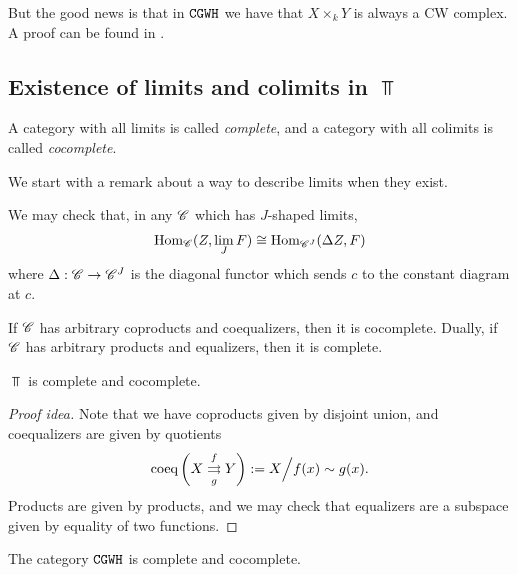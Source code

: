 \documentclass{article}[11pt]
\begin{document}
But the good news is that in $\texttt{CGWH}$ we have that $X\times_k Y$ is always a CW complex. A proof can be found in \cite[Theorem A.6]{Hatcher}.

\subsection{Existence of limits and colimits in $\Top$}

\begin{definition} A category with all limits is called \textit{complete}, and a category with all colimits is called \textit{cocomplete}.
\end{definition}

We start with a remark about a way to describe limits when they exist. 

\begin{remark}\label{diagonallimit} We may check that, in any $\mathscr{C}$ which has $J$-shaped limits,
	\begin{align*}
		\textup{Hom}_{\mathscr{C}} (Z, \lim_J F) \cong \textup{Hom}_{\mathscr{C}^J} (\Delta  Z, F)
	\end{align*}
	where $\Delta : \mathscr{C} \to \mathscr{C}^J$ is the diagonal functor which sends $c$ to the constant diagram at $c$.
\end{remark}

\begin{proposition} If $\mathscr{C}$ has arbitrary coproducts and coequalizers, then it is cocomplete. Dually, if $\mathscr{C}$ has arbitrary products and equalizers, then it is complete.
\end{proposition}

\begin{proposition} $\Top$ is complete and cocomplete.
\end{proposition}
\begin{proof}[Proof idea] Note that we have coproducts given by disjoint union, and coequalizers are given by quotients
\begin{align*}
	\text{coeq} \left( X \overset{f}{\underset{g}{\rightrightarrows}} Y \right) := X\Big/f(x) \sim g(x).
\end{align*}
Products are given by products, and we may check that equalizers are a subspace given by equality of two functions.

\end{proof}

\begin{proposition} The category $\texttt{CGWH}$ is  complete and cocomplete.
\end{proposition}
\end{document}
